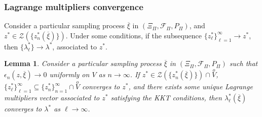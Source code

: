 \documentclass{beamer}
\newtheorem{lem}{Lemma}
\begin{document}
\begin{frame}
\frametitle{Lagrange multipliers convergence}

Consider a particular sampling process $\overline{\xi}$ in $(\Xi_{\Pi}, \mathcal{F}_{\Pi}, P_{\Pi})$, and $z^*
\in \mathcal{Z}\left(\lbrace z^*_n(\overline{\xi})\rbrace\right)$.
Under some conditions, if the subsequence $\lbrace z_{\ell}^* \rbrace_{\ell =  1}^{\infty} \rightarrow z^*$, then %
$\lbrace \lambda_{\ell}^* \rbrace %
\rightarrow \lambda^*$, associated to $z^*$. %

\mbox{}

\begin{lem}
Consider a particular sampling process
$\overline{\xi}$ in $(\Xi_{\Pi}, \mathcal{F}_{\Pi}, P_{\Pi})$ such that
$\epsilon_n \left( z, \overline{\xi} \right) \rightarrow 0$
uniformly on $V$ as $n \rightarrow \infty$.
If $z^* \in \mathcal{Z} \left(\lbrace
z^*_n(\overline{\xi})\rbrace\right) \cap \overset{o}{V}$, $\lbrace
z_{\ell}^* \rbrace_{\ell =  1}^{\infty} \subseteq \lbrace z_n^*
\rbrace_{n =  1}^{\infty} \cap \overset{o}{V}$ converges to $z^*$,
and there exists some unique Lagrange multipliers vector associated to $z^*$ satisfying the KKT conditions, then $\lambda^*_{\ell}(\overline{\xi})$ converges to $\lambda^*$ as $\ell \rightarrow \infty$.
\end{lem}

\end{frame}
\end{document}
